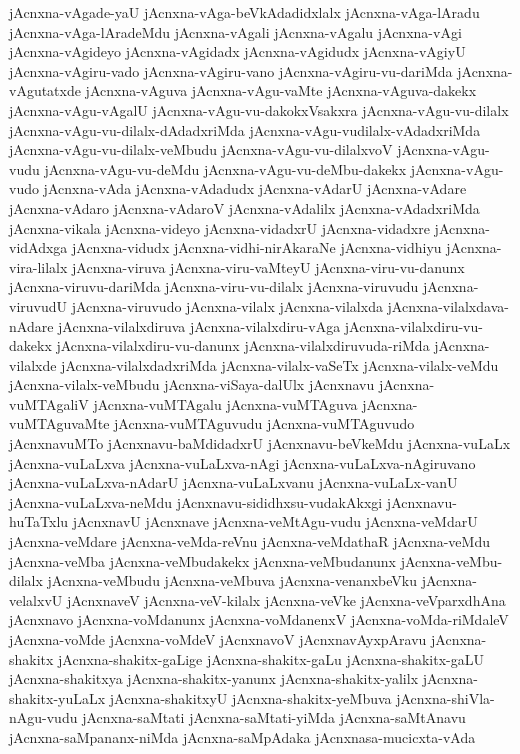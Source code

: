 {jAcnxna-vAgade-yaU
jAcnxna-vAga-beVkAdadidxlalx
jAcnxna-vAga-lAradu
jAcnxna-vAga-lAradeMdu
jAcnxna-vAgali
jAcnxna-vAgalu
jAcnxna-vAgi
jAcnxna-vAgideyo
jAcnxna-vAgidadx
jAcnxna-vAgidudx
jAcnxna-vAgiyU
jAcnxna-vAgiru-vado
jAcnxna-vAgiru-vano
jAcnxna-vAgiru-vu-dariMda
jAcnxna-vAgutatxde
jAcnxna-vAguva
jAcnxna-vAgu-vaMte
jAcnxna-vAguva-dakekx
jAcnxna-vAgu-vAgalU
jAcnxna-vAgu-vu-dakokxVsakxra
jAcnxna-vAgu-vu-dilalx
jAcnxna-vAgu-vu-dilalx-dAdadxriMda
jAcnxna-vAgu-vudilalx-vAdadxriMda
jAcnxna-vAgu-vu-dilalx-veMbudu
jAcnxna-vAgu-vu-dilalxvoV
jAcnxna-vAgu-vudu
jAcnxna-vAgu-vu-deMdu
jAcnxna-vAgu-vu-deMbu-dakekx
jAcnxna-vAgu-vudo
jAcnxna-vAda
jAcnxna-vAdadudx
jAcnxna-vAdarU
jAcnxna-vAdare
jAcnxna-vAdaro
jAcnxna-vAdaroV
jAcnxna-vAdalilx
jAcnxna-vAdadxriMda
jAcnxna-vikala
jAcnxna-videyo
jAcnxna-vidadxrU
jAcnxna-vidadxre
jAcnxna-vidAdxga
jAcnxna-vidudx
jAcnxna-vidhi-nirAkaraNe
jAcnxna-vidhiyu
jAcnxna-vira-lilalx
jAcnxna-viruva
jAcnxna-viru-vaMteyU
jAcnxna-viru-vu-danunx
jAcnxna-viruvu-dariMda
jAcnxna-viru-vu-dilalx
jAcnxna-viruvudu
jAcnxna-viruvudU
jAcnxna-viruvudo
jAcnxna-vilalx
jAcnxna-vilalxda
jAcnxna-vilalxdava-nAdare
jAcnxna-vilalxdiruva
jAcnxna-vilalxdiru-vAga
jAcnxna-vilalxdiru-vu-dakekx
jAcnxna-vilalxdiru-vu-danunx
jAcnxna-vilalxdiruvuda-riMda
jAcnxna-vilalxde
jAcnxna-vilalxdadxriMda
jAcnxna-vilalx-vaSeTx
jAcnxna-vilalx-veMdu
jAcnxna-vilalx-veMbudu
jAcnxna-viSaya-dalUlx
jAcnxnavu
jAcnxna-vuMTAgaliV
jAcnxna-vuMTAgalu
jAcnxna-vuMTAguva
jAcnxna-vuMTAguvaMte
jAcnxna-vuMTAguvudu
jAcnxna-vuMTAguvudo
jAcnxnavuMTo
jAcnxnavu-baMdidadxrU
jAcnxnavu-beVkeMdu
jAcnxna-vuLaLx
jAcnxna-vuLaLxva
jAcnxna-vuLaLxva-nAgi
jAcnxna-vuLaLxva-nAgiruvano
jAcnxna-vuLaLxva-nAdarU
jAcnxna-vuLaLxvanu
jAcnxna-vuLaLx-vanU
jAcnxna-vuLaLxva-neMdu
jAcnxnavu-sididhxsu-vudakAkxgi
jAcnxnavu-huTaTxlu
jAcnxnavU
jAcnxnave
jAcnxna-veMtAgu-vudu
jAcnxna-veMdarU
jAcnxna-veMdare
jAcnxna-veMda-reVnu
jAcnxna-veMdathaR
jAcnxna-veMdu
jAcnxna-veMba
jAcnxna-veMbudakekx
jAcnxna-veMbudanunx
jAcnxna-veMbu-dilalx
jAcnxna-veMbudu
jAcnxna-veMbuva
jAcnxna-venanxbeVku
jAcnxna-velalxvU
jAcnxnaveV
jAcnxna-veV-kilalx
jAcnxna-veVke
jAcnxna-veVparxdhAna
jAcnxnavo
jAcnxna-voMdanunx
jAcnxna-voMdanenxV
jAcnxna-voMda-riMdaleV
jAcnxna-voMde
jAcnxna-voMdeV
jAcnxnavoV
jAcnxnavAyxpAravu
jAcnxna-shakitx
jAcnxna-shakitx-gaLige
jAcnxna-shakitx-gaLu
jAcnxna-shakitx-gaLU
jAcnxna-shakitxya
jAcnxna-shakitx-yanunx
jAcnxna-shakitx-yalilx
jAcnxna-shakitx-yuLaLx
jAcnxna-shakitxyU
jAcnxna-shakitx-yeMbuva
jAcnxna-shiVla-nAgu-vudu
jAcnxna-saMtati
jAcnxna-saMtati-yiMda
jAcnxna-saMtAnavu
jAcnxna-saMpananx-niMda
jAcnxna-saMpAdaka
jAcnxnasa-mucicxta-vAda
}
